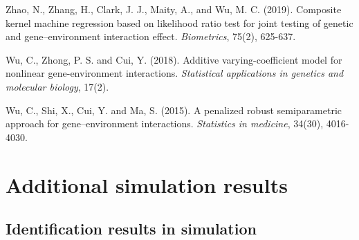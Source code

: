 \documentclass[12pt]{article}
\begin{document}
\begin{thebibliography}{99}
Zhao, N., Zhang, H., Clark, J. J., Maity, A., and Wu, M. C. (2019). Composite kernel machine regression based on likelihood ratio test for joint testing of genetic and gene–environment interaction effect. \emph{Biometrics}, 75(2), 625-637.

Wu, C., Zhong, P. S. and Cui, Y. (2018). Additive varying-coefficient model for nonlinear gene-environment interactions. \emph{Statistical applications in genetics and molecular biology}, 17(2).

Wu, C., Shi, X., Cui, Y. and Ma, S. (2015). A penalized robust semiparametric approach for gene–environment interactions. \emph{Statistics in medicine}, 34(30), 4016-4030.







\end{thebibliography}


\clearpage
\appendix
\section{Additional simulation results}
\subsection{Identification results in simulation}
\end{document}
